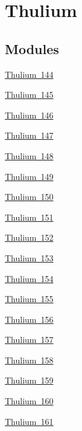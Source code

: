 \hypertarget{group___isotope_const-_thulium}{}\section{Thulium}
\label{group___isotope_const-_thulium}
\subsection*{Modules}
\begin{DoxyCompactItemize}
\item 
\mbox{\hyperlink{group___isotope_const-_thulium-_tm144}{Thulium 144}}
\item 
\mbox{\hyperlink{group___isotope_const-_thulium-_tm145}{Thulium 145}}
\item 
\mbox{\hyperlink{group___isotope_const-_thulium-_tm146}{Thulium 146}}
\item 
\mbox{\hyperlink{group___isotope_const-_thulium-_tm147}{Thulium 147}}
\item 
\mbox{\hyperlink{group___isotope_const-_thulium-_tm148}{Thulium 148}}
\item 
\mbox{\hyperlink{group___isotope_const-_thulium-_tm149}{Thulium 149}}
\item 
\mbox{\hyperlink{group___isotope_const-_thulium-_tm150}{Thulium 150}}
\item 
\mbox{\hyperlink{group___isotope_const-_thulium-_tm151}{Thulium 151}}
\item 
\mbox{\hyperlink{group___isotope_const-_thulium-_tm152}{Thulium 152}}
\item 
\mbox{\hyperlink{group___isotope_const-_thulium-_tm153}{Thulium 153}}
\item 
\mbox{\hyperlink{group___isotope_const-_thulium-_tm154}{Thulium 154}}
\item 
\mbox{\hyperlink{group___isotope_const-_thulium-_tm155}{Thulium 155}}
\item 
\mbox{\hyperlink{group___isotope_const-_thulium-_tm156}{Thulium 156}}
\item 
\mbox{\hyperlink{group___isotope_const-_thulium-_tm157}{Thulium 157}}
\item 
\mbox{\hyperlink{group___isotope_const-_thulium-_tm158}{Thulium 158}}
\item 
\mbox{\hyperlink{group___isotope_const-_thulium-_tm159}{Thulium 159}}
\item 
\mbox{\hyperlink{group___isotope_const-_thulium-_tm160}{Thulium 160}}
\item 
\mbox{\hyperlink{group___isotope_const-_thulium-_tm161}{Thulium 161}}

\end{DoxyCompactItemize}
